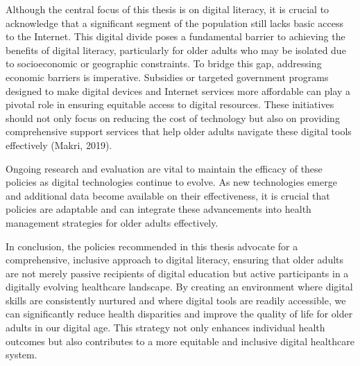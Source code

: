 Although the central focus of this thesis is on digital literacy, it is crucial to acknowledge that a significant segment of the population still lacks basic access to the Internet. This digital divide poses a fundamental barrier to achieving the benefits of digital literacy, particularly for older adults who may be isolated due to socioeconomic or geographic constraints. To bridge this gap, addressing economic barriers is imperative. Subsidies or targeted government programs designed to make digital devices and Internet services more affordable can play a pivotal role in ensuring equitable access to digital resources. These initiatives should not only focus on reducing the cost of technology but also on providing comprehensive support services that help older adults navigate these digital tools effectively (Makri, 2019).

Ongoing research and evaluation are vital to maintain the efficacy of these policies as digital technologies continue to evolve. As new technologies emerge and additional data become available on their effectiveness, it is crucial that policies are adaptable and can integrate these advancements into health management strategies for older adults effectively.

In conclusion, the policies recommended in this thesis advocate for a comprehensive, inclusive approach to digital literacy, ensuring that older adults are not merely passive recipients of digital education but active participants in a digitally evolving healthcare landscape. By creating an environment where digital skills are consistently nurtured and where digital tools are readily accessible, we can significantly reduce health disparities and improve the quality of life for older adults in our digital age. This strategy not only enhances individual health outcomes but also contributes to a more equitable and inclusive digital healthcare system.
